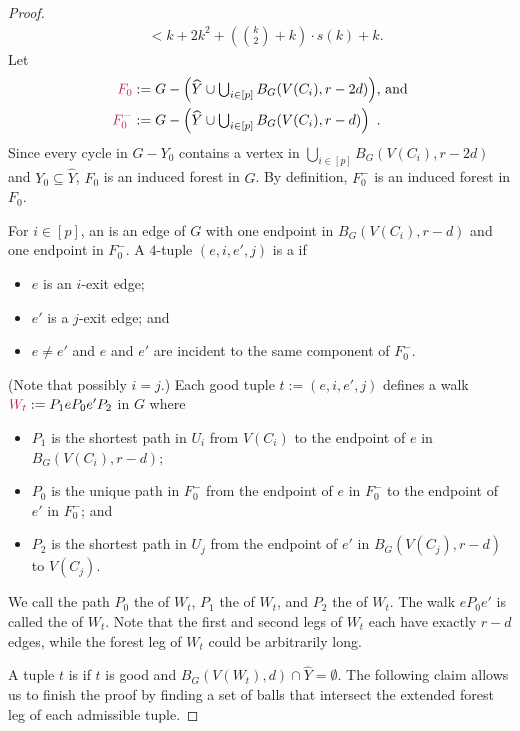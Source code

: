 \documentclass{patmorin}
\begin{document}
\begin{proof}
\begin{equation}
\begin{split}
    &\textstyle< k + 2k^2+(\binom{k}{2}+k)\cdot s(k) + k.
    \end{split} \label{x_prime_size}
  \end{equation}
  Let
  \begin{align*}
    \mathdefin{F_0}
      & := \textstyle{G-\left(\widehat{Y}\cup \bigcup_{i\in[p]} B_G(V(C_i),r-2d)\right)}\text{, and}\\
    \mathdefin{F^-_0}
      & := \textstyle{G-\left(\widehat{Y}\cup \bigcup_{i\in[p]} B_G(V(C_i),r-d)\right)} \enspace .
  \end{align*}
  Since every cycle in $G-Y_0$ contains a vertex in $\bigcup_{i\in[p]} B_G(V(C_i),r-2d)$ and $Y_0\subseteq \widehat{Y}$, $F_0$ is an induced forest in $G$. By definition, $F^-_0$  is an induced forest in $F_0$.

  For $i\in[p]$, an  is an edge of $G$ with one endpoint in $B_G(V(C_i),r-d)$ and one endpoint in $F_0^-$. A $4$-tuple $(e,i,e',j)$ is a  if
  \begin{itemize}[noitemsep,nosep]
    \item $e$ is an $i$-exit edge;
    \item $e'$ is a $j$-exit edge;
    and \item $e\neq e'$ and $e$ and $e'$ are incident to the same component of $F_0^-$.
  \end{itemize}
  (Note that possibly $i=j$.) Each good tuple $t:=(e,i,e',j)$  defines a walk $\mathdefin{W_t}:=P_1eP_0e'P_2$ in $G$ where
  \begin{itemize}[noitemsep,nosep]
    \item $P_1$ is the shortest path in $U_i$ from $V(C_i)$ to the endpoint of $e$ in $B_G(V(C_i),r-d)$;
    \item $P_0$ is the unique path in $F_0^-$ from the endpoint of $e$ in $F^-_0$ to the endpoint of $e'$ in $F^-_0$; and
    \item $P_2$ is the shortest path in $U_j$ from the endpoint of $e'$ in $B_G(V(C_j),r-d)$ to $V(C_j)$.
  \end{itemize}
  We call the path $P_0$ the  of $W_t$, $P_1$ the  of $W_t$, and $P_2$ the  of $W_t$.  The walk $eP_0e'$ is called the  of $W_t$.  Note that the first and second legs of $W_t$ each have exactly $r-d$ edges, while the forest leg of $W_t$ could be arbitrarily long.

  A tuple $t$ is  if $t$ is good and $B_G(V(W_t),d) \cap \widehat{Y} = \emptyset$.  The following claim allows us to finish the proof by finding a set of balls that intersect the extended forest leg of each admissible tuple.


\end{proof}
\end{document}
